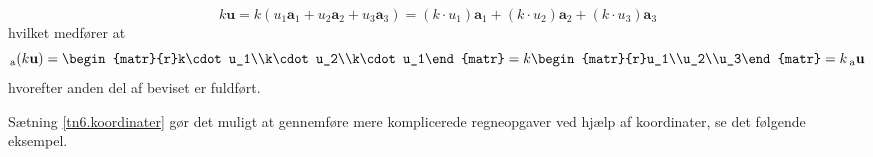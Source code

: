 \begin{bevis}
\begin{equation}
k\mathbf u=k(u_1\mathbf a_1+u_2\mathbf a_2+u_3\mathbf a_3)
=(k\cdot u_1)\mathbf a_1+(k\cdot u_2)\mathbf a_2+(k\cdot u_3)\mathbf a_3
\end{equation}
hvilket medfører at
\begin{equation}
_\mathrm a(k\mathbf u)=\begin{matr}{r}k\cdot u_1\\k\cdot u_2\\k\cdot u_1\end{matr}=
k\begin{matr}{r}u_1\\u_2\\u_3\end{matr}=k\,_\mathrm a\mathbf u
\end{equation}
hvorefter anden del af beviset er fuldført.
\end{bevis}
Sætning \ref{tn6.koordinater} gør det muligt at gennemføre mere komplicerede regneopgaver ved hjælp af koordinater, se det følgende eksempel. 
